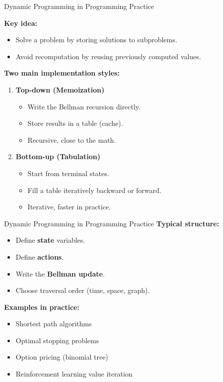 \documentclass[aspectratio=169]{beamer}
\begin{document}
\begin{frame}{Dynamic Programming in Programming Practice}

\textbf{Key idea:}
\begin{itemize}
  \item Solve a problem by storing solutions to subproblems.\pause
  \item Avoid recomputation by reusing previously computed values.\pause
\end{itemize}

\medskip
\textbf{Two main implementation styles:}


\begin{enumerate}
  \item \textbf{Top-down (Memoization)}
  \begin{itemize}
    \item Write the Bellman recursion directly.\pause
    \item Store results in a table (cache).\pause
    \item Recursive, close to the math.\pause
  \end{itemize}
    

  \item \textbf{Bottom-up (Tabulation)}
  \begin{itemize}
    \item Start from terminal states.\pause
    \item Fill a table iteratively backward or forward.\pause
    \item Iterative, faster in practice.
  \end{itemize}
\end{enumerate}
\end{frame}

\begin{frame}{Dynamic Programming in Programming Practice}
\textbf{Typical structure:}
\begin{itemize}
  \item Define \textbf{state} variables.\pause
  \item Define \textbf{actions}.\pause
  \item Write the \textbf{Bellman update}.\pause
  \item Choose traversal order (time, space, graph).\pause
\end{itemize}

\medskip
\textbf{Examples in practice:}
\begin{itemize}
  \item Shortest path algorithms\pause
  \item Optimal stopping problems\pause
  \item Option pricing (binomial tree)\pause
  \item Reinforcement learning value iteration
\end{itemize}

\end{frame}
\end{document}

